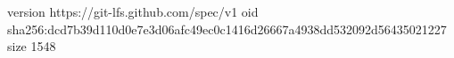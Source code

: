 version https://git-lfs.github.com/spec/v1
oid sha256:dcd7b39d110d0e7e3d06afc49ec0c1416d26667a4938dd532092d56435021227
size 1548
